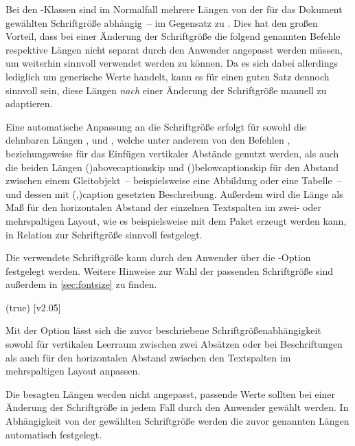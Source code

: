 \begin{DeclareEntity*}{}
\begin{DeclareEntity*}{}
\begin{DeclareEntity*}{}
Bei den \TUDScript-Klassen sind im Normalfall mehrere Längen von der für das 
Dokument gewählten Schriftgröße abhängig~-- im Gegensatz zu \KOMAScript. Dies 
hat den großen Vorteil, dass bei einer Änderung der Schriftgröße die folgend 
genannten Befehle respektive Längen nicht separat durch den Anwender angepasst 
werden müssen, um weiterhin sinnvoll verwendet werden zu können.
Da es sich dabei allerdings 
lediglich um generische Werte handelt, kann es für einen guten Satz dennoch 
sinnvoll sein, diese Längen \emph{nach} einer Änderung der Schriftgröße manuell 
zu adaptieren.

Eine automatische Anpassung an die Schriftgröße erfolgt für sowohl die 
dehnbaren Längen ,  und 
, welche unter anderem von den Befehlen 
,  beziehungsweise  für das 
Einfügen vertikaler Abstände genutzt werden, als auch die beiden Längen 
\Length(){abovecaptionskip} und 
\Length(){belowcaptionskip} 
für den Abstand zwischen einem Gleitobjekt~-- beispielsweise eine Abbildung 
oder eine Tabelle~-- und dessen mit 
\Macro(,){caption} 
gesetzten Beschreibung. Außerdem wird die Länge  als Maß für 
den horizontalen Abstand der einzelnen Textspalten im zwei- oder mehrspaltigen 
Layout, wie es beispielsweise mit dem Paket  erzeugt werden 
kann, in Relation zur Schriftgröße sinnvoll festgelegt.

Die verwendete Schriftgröße kann durch den Anwender über die \KOMAScript-Option 
 festgelegt 
werden.
Weitere Hinweise zur Wahl der passenden Schriftgröße sind außerdem in 
\autoref{sec:fontsize} zu finden.

\begin{Declaration}
  {}
  (true)
  [v2.05]
\printdeclarationlist

Mit der Option  lässt sich die zuvor beschriebene 
Schriftgrößenabhängigkeit sowohl für vertikalen Leerraum zwischen zwei Absätzen 
oder bei Beschriftungen als auch für den horizontalen Abstand zwischen den 
Textspalten im mehrspaltigen Layout anpassen.
%
\begin{DeclareValues}{}
  Die besagten Längen werden nicht angepasst, passende Werte sollten bei einer 
  Änderung der Schriftgröße in jedem Fall durch den Anwender gewählt werden.
  In Abhängigkeit von der gewählten Schriftgröße werden die zuvor genannten 
  Längen automatisch festgelegt.
\end{DeclareValues}
\end{Declaration}




\end{DeclareEntity*}
\end{DeclareEntity*}
\end{DeclareEntity*}
